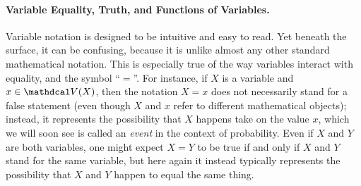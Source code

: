 \paragraph{Variable Equality, Truth, and Functions of Variables.}
Variable notation is designed to be intuitive and easy to read. 
Yet beneath the surface, it can be confusing, because it is unlike almost any other standard mathematical notation.
This is especially true of the way variables interact with equality, and the symbol ``$=$''.
For instance, if $X$ is a variable and $x \in \V(X)$, then the notation $X{=}x$ does not necessarily stand for a false statement (even though $X$ and $x$ refer to different mathematical objects); instead, it represents the possibility that $X$ happens take on the value $x$, which we will soon see is called an \emph{event} in the context of probability. 
Even if $X$ and $Y$ are both variables, one might expect $X{=}Y$ to be true if and only if $X$ and $Y$ stand for the same variable, but here again it instead typically represents the possibility that $X$ and $Y$ happen to equal the same thing. 

